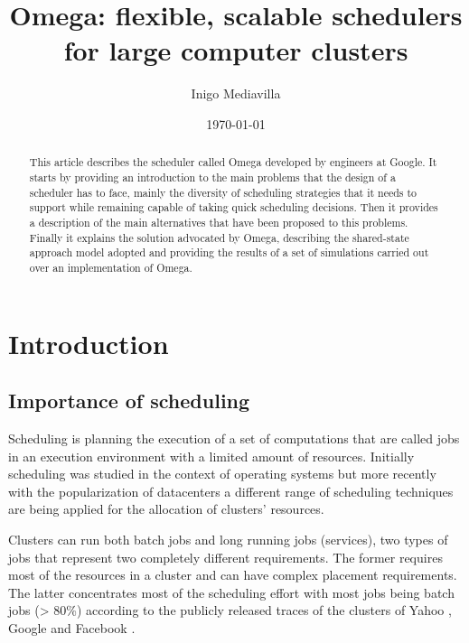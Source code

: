\documentclass{svjour3}                     %
\begin{document}
\title{  Omega: flexible, scalable schedulers for large computer clusters  }


\author{ Inigo Mediavilla }

\date{\today}

\maketitle

\begin{abstract}
This article describes the scheduler called Omega developed by
engineers at Google. It starts by providing an introduction to the
main problems that the design of a scheduler has to face, mainly the
diversity of scheduling strategies that it needs to support
while remaining capable of taking quick scheduling decisions. Then it
provides a description of the main alternatives that have been
proposed to this problems. Finally it explains the solution advocated
by Omega, describing the shared-state approach model adopted and
providing the results of a set of simulations carried out over an
implementation of Omega.
\end{abstract}

\section{Introduction}

\subsection{Importance of scheduling}

Scheduling is planning the execution of a set of computations that
are called jobs in an execution environment with a limited amount of
resources. Initially scheduling was studied in the context of
operating systems but more recently with the popularization 
of datacenters a different range of scheduling techniques are being
applied for the allocation of clusters' resources.

Clusters can run both batch jobs and long running jobs (services), two
types of jobs that represent two completely different requirements.
The former requires most of the resources in a cluster and can have
complex placement requirements. The latter concentrates most of the scheduling
effort with most jobs being batch jobs (> 80\%) according to the publicly
released traces of the clusters of Yahoo \cite{parashar_10th_2010}, Google \cite{mishra_towards_2010} and Facebook \cite{Chen:EECS-2012-17}.
\end{document}
